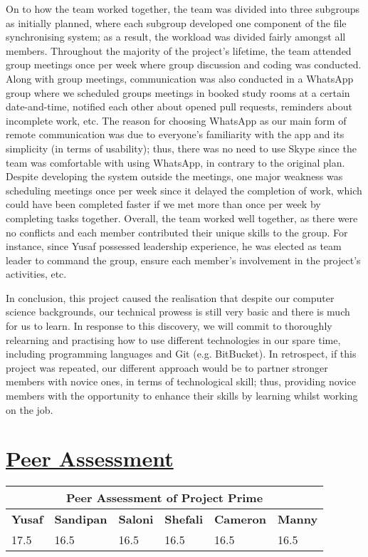 \documentclass{article}
\begin{document}
\noindent On to how the team worked together, the team was divided into three subgroups as initially planned, where each subgroup developed one component of the file synchronising system; as a result, the workload was divided fairly amongst all members. Throughout the majority of the project's lifetime, the team attended group meetings once per week where group discussion and coding was conducted. Along with group meetings, communication was also conducted in a WhatsApp group where we scheduled groups meetings in booked study rooms at a certain date-and-time, notified each other about opened pull requests, reminders about incomplete work, etc. The reason for choosing WhatsApp as our main form of remote communication was due to everyone's familiarity with the app and its simplicity (in terms of usability); thus, there was no need to use Skype since the team was comfortable with using WhatsApp, in contrary to the original plan. Despite developing the system outside the meetings, one major weakness was scheduling meetings once per week since it delayed the completion of work, which could have been completed faster if we met more than once per week by completing tasks together. Overall, the team worked well together, as there were no conflicts and each member contributed their unique  skills to the group. For instance, since Yusaf possessed leadership experience, he was elected as team leader to command the group, ensure each member's involvement in the project's activities, etc.

\noindent In conclusion, this project caused the realisation that despite our computer science backgrounds, our technical prowess is still very basic and there is much for us to learn. In response to this discovery, we will commit to thoroughly relearning and practising how to use different technologies in our spare time, including programming languages and Git (e.g. BitBucket). In retrospect, if this project was repeated, our different approach would be to partner stronger members with novice ones, in terms of technological skill; thus, providing novice members with the opportunity to enhance their skills by learning whilst working on the job.

\section{\underline{Peer Assessment}}
\begin{tabular}{|p{1.5cm}|p{1.5cm}|p{1.5cm}|p{1.5cm}|p{1.5cm}|p{1.5cm}|}
\hline
\multicolumn{6}{|c|}{\textbf{Peer Assessment of Project Prime}} \\
\hline
\textbf{Yusaf} & \textbf{Sandipan} & \textbf{Saloni} & \textbf{Shefali} & \textbf{Cameron} & \textbf{Manny} \\
\hline
17.5 & 16.5 & 16.5 & 16.5 & 16.5 & 16.5 \\
\hline
\end{tabular}
\end{document}
